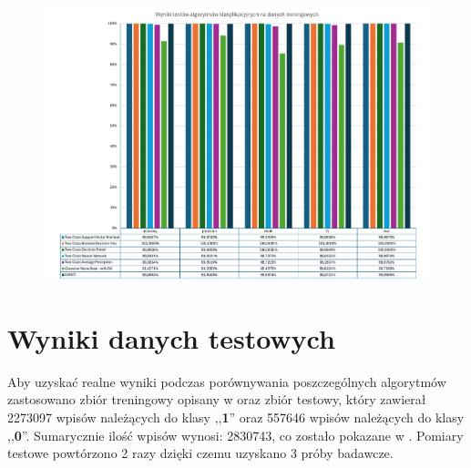 \begin{landscape}
    \vspace*{\fill}
    \begin{figure}[H]
        \centering
        \includegraphics[height=0.8\textwidth]{images/predict_same}
        \label{fig:predict-same}
    \end{figure}
    \vfill
\end{landscape}


\section{Wyniki danych testowych}
Aby uzyskać realne wyniki podczas porównywania poszczególnych algorytmów zastosowano zbiór treningowy opisany w  oraz zbiór testowy, który zawierał 2273097 wpisów należących do klasy ,,\textbf{1}'' oraz 557646 wpisów należących do klasy ,,\textbf{0}''. Sumarycznie ilość wpisów wynosi: 2830743, co zostało pokazane w . Pomiary testowe powtórzono 2 razy dzięki czemu uzyskano 3 próby badawcze.

